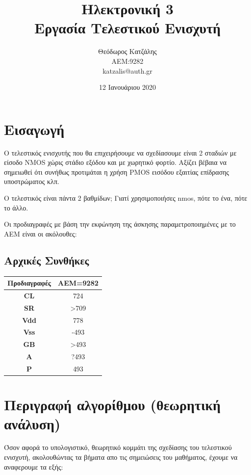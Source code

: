 \documentclass[12pt, a4paper]{article}
\title{\textbf{Ηλεκτρονική 3} \\ \textbf{Εργασία Τελεστικού Ενισχυτή}}
\author{Θεόδωρος Κατζάλης \\ ΑΕΜ:9282 \\ katzalis@auth.gr}
\date{12 Ιανουάριου 2020}
\begin{document}
\maketitle
\sloppy
\tableofcontents
\pagebreak

\section{Εισαγωγή}

Ο τελεστικός ενισχυτής που θα επιχειρήσουμε να σχεδίασουμε είναι 2 σταδιών με είσοδο ΝMOS χώρις στάδιο εξόδου και με χωρητικό φορτίο. Αξίζει βέβαια να σημειωθεί ότι συνήθως προτιμάται η χρήση PMOS εισόδου εξαιτίας επίδρασης υποστρώματος κλπ.

Ο τελεστικός είναι πάντα 2 βαθμίδων; Γιατί χρησιμοποιήσες nmos, πότε το ένα, πότε το άλλο.

Οι προδιαγραφές με βάση την εκφώνηση της άσκησης παραμετροποιημένες με το ΑΕΜ είναι οι ακόλουθες:
\subsection{Αρχικές Συνθήκες}


\begin{table}[h!]
\centering
\begin{tabular}{|c|c|}
	\hline
	Προδιαγραφές & AEM=9282  \\
	\hline
	\textbf{CL} & 724 \\
	\hline
	\textbf{SR} & >709 \\
	\hline
	\textbf{Vdd} & 778 \\
	\hline
	\textbf{Vss} & -493 \\
	\hline
	\textbf{GB} & >493 \\
    \hline
    \textbf{A} & ?493 \\
    \hline
    \textbf{P} & 493 \\
    \hline
\end{tabular}
\end{table}

\section{Περιγραφή αλγορίθμου (θεωρητική ανάλυση)}

Όσον αφορά το υπολογιστικό, θεωρητικό κομμάτι της σχεδίασης του τελεστικού ενισχυτή, ακολουθώντας τα βήματα απο τις σημειώσεις του μαθήματος, έχουμε να αναφερουμε τα εξής:
\end{document}
